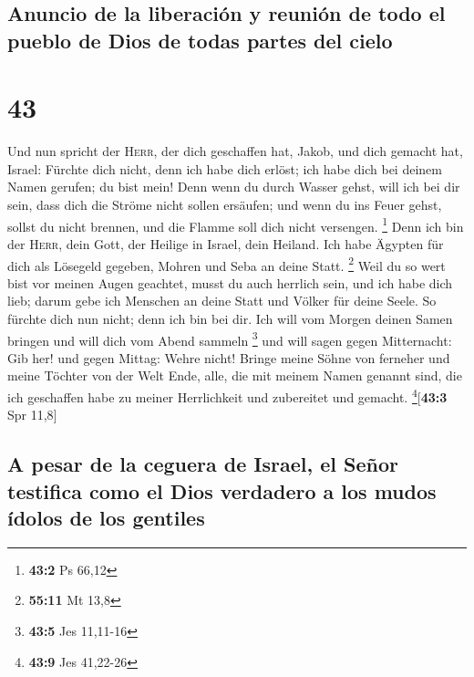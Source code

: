 \hypertarget{anuncio-de-la-liberaciuxf3n-y-reuniuxf3n-de-todo-el-pueblo-de-dios-de-todas-partes-del-cielo}{%
\subsection{Anuncio de la liberación y reunión de todo el pueblo de Dios
de todas partes del
cielo}\label{anuncio-de-la-liberaciuxf3n-y-reuniuxf3n-de-todo-el-pueblo-de-dios-de-todas-partes-del-cielo}}

\hypertarget{section-42}{%
\section{43}\label{section-42}}

 Und nun spricht der \textsc{Herr}, der dich geschaffen
hat, Jakob, und dich gemacht hat, Israel: Fürchte dich nicht, denn ich
habe dich erlöst; ich habe dich bei deinem Namen gerufen; du bist mein!
 Denn wenn du durch Wasser gehst, will ich bei dir sein,
dass dich die Ströme nicht sollen ersäufen; und wenn du ins Feuer gehst,
sollst du nicht brennen, und die Flamme soll dich nicht versengen.
\footnote{\textbf{43:2} Ps 66,12}  Denn ich bin der
\textsc{Herr}, dein Gott, der Heilige in Israel, dein Heiland. Ich habe
Ägypten für dich als Lösegeld gegeben, Mohren und Seba an deine Statt.
\footnote{\textbf{55:11} Mt 13,8}  Weil du so wert bist
vor meinen Augen geachtet, musst du auch herrlich sein, und ich habe
dich lieb; darum gebe ich Menschen an deine Statt und Völker für deine
Seele.  So fürchte dich nun nicht; denn ich bin bei dir.
Ich will vom Morgen deinen Samen bringen und will dich vom Abend sammeln
\footnote{\textbf{43:5} Jes 11,11-16}  und will sagen
gegen Mitternacht: Gib her! und gegen Mittag: Wehre nicht! Bringe meine
Söhne von ferneher und meine Töchter von der Welt Ende, 
alle, die mit meinem Namen genannt sind, die ich geschaffen habe zu
meiner Herrlichkeit und zubereitet und gemacht.
\footnote{\textbf{43:9} Jes 41,22-26}{[}\textbf{43:3} Spr 11,8{]}

\hypertarget{a-pesar-de-la-ceguera-de-israel-el-seuxf1or-testifica-como-el-dios-verdadero-a-los-mudos-uxeddolos-de-los-gentiles}{%
\subsection{A pesar de la ceguera de Israel, el Señor testifica como el
Dios verdadero a los mudos ídolos de los
gentiles}\label{a-pesar-de-la-ceguera-de-israel-el-seuxf1or-testifica-como-el-dios-verdadero-a-los-mudos-uxeddolos-de-los-gentiles}}

